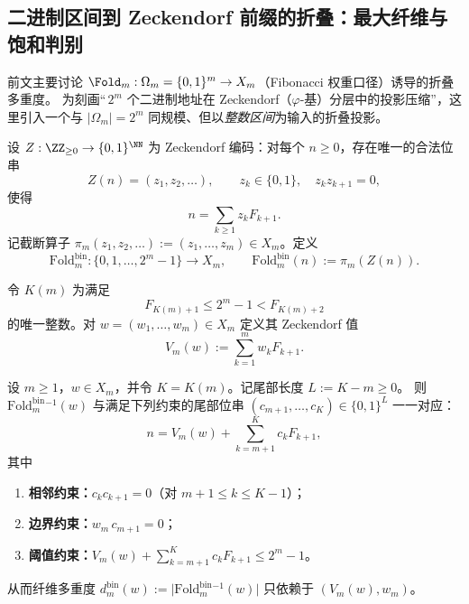 \subsection{二进制区间到 Zeckendorf 前缀的折叠：最大纤维与饱和判别}\label{app:fold-binary-prefix}

前文主要讨论 \(\Fold_m:\Omega_m=\{0,1\}^m\to X_m\)（Fibonacci 权重口径）诱导的折叠多重度。
为刻画“\(\,2^m\) 个二进制地址在 Zeckendorf（\(\varphi\)-基）分层中的投影压缩”，这里引入一个与 \(|\Omega_m|=2^m\) 同规模、但以\emph{整数区间}为输入的折叠投影。

\begin{definition}\label{def:fold-bin}
设 \(Z:\ZZ_{\ge 0}\to\{0,1\}^{\NN}\) 为 Zeckendorf 编码：对每个 \(n\ge 0\)，存在唯一的合法位串
\[
Z(n)=(z_1,z_2,\dots),\qquad z_k\in\{0,1\},\quad z_k z_{k+1}=0,
\]
使得
\[
n=\sum_{k\ge 1} z_k F_{k+1}.
\]
记截断算子 \(\pi_m(z_1,z_2,\dots):=(z_1,\dots,z_m)\in X_m\)。定义
\[
\mathrm{Fold}^{\mathrm{bin}}_m:\{0,1,\dots,2^m-1\}\to X_m,\qquad
\mathrm{Fold}^{\mathrm{bin}}_m(n):=\pi_m(Z(n)).
\]
\end{definition}

\begin{definition}[\(K(m)\) 与 Zeckendorf 值]\label{def:K-of-m}
令 \(K(m)\) 为满足
\begin{equation}\label{eq:K-of-m}
F_{K(m)+1}\le 2^m-1 < F_{K(m)+2}
\end{equation}
的唯一整数。对 \(w=(w_1,\dots,w_m)\in X_m\) 定义其 Zeckendorf 值
\[
V_m(w):=\sum_{k=1}^m w_k F_{k+1}.
\]
\end{definition}

\begin{proposition}[纤维的尾部表示]\label{prop:fold-bin-fiber-tail}
设 \(m\ge 1\)，\(w\in X_m\)，并令 \(K=K(m)\)。记尾部长度 \(L:=K-m\ge 0\)。
则 \(\mathrm{Fold}^{\mathrm{bin}}_m{}^{-1}(w)\) 与满足下列约束的尾部位串 \((c_{m+1},\dots,c_K)\in\{0,1\}^{L}\) 一一对应：
\[
n
=V_m(w)+\sum_{k=m+1}^{K} c_k F_{k+1},
\]
其中
\begin{enumerate}
  \item \textbf{相邻约束：}\quad \(c_k c_{k+1}=0\)（对 \(m+1\le k\le K-1\)）；
  \item \textbf{边界约束：}\quad \(w_m\,c_{m+1}=0\)；
  \item \textbf{阈值约束：}\quad \(V_m(w)+\sum_{k=m+1}^{K} c_k F_{k+1}\le 2^m-1\)。
\end{enumerate}
从而纤维多重度
\(
d^{\mathrm{bin}}_m(w):=\bigl|\mathrm{Fold}^{\mathrm{bin}}_m{}^{-1}(w)\bigr|
\)
只依赖于 \((V_m(w),w_m)\)。
\end{proposition}

